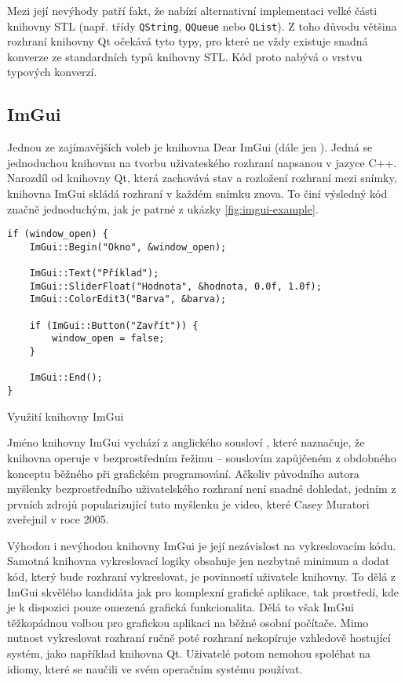 
Mezi její nevýhody patří fakt, že nabízí alternativní implementaci velké části knihovny STL (např. třídy \texttt{QString}, \texttt{QQueue} nebo \texttt{QList}). Z toho důvodu většina rozhraní knihovny Qt očekává tyto typy, pro které ne vždy existuje snadná konverze ze standardních typů knihovny STL. Kód proto nabývá o vrstvu typových konverzí.

\subsection{ImGui}

Jednou ze zajímavějších voleb je knihovna Dear ImGui\cite{github-imgui} (dále jen ). Jedná se jednoduchou knihovnu na tvorbu uživateského rozhraní napsanou v jazyce C++. Narozdíl od knihovny Qt, která zachovává stav a rozložení rozhraní mezi snímky, knihovna ImGui skládá rozhraní v každém snímku znova. To činí výsledný kód značně jednoduchým, jak je patrné z ukázky \ref{fig:imgui-example}.

\begin{listing}
\begin{verbatim}
if (window_open) {
    ImGui::Begin("Okno", &window_open);

    ImGui::Text("Příklad");
    ImGui::SliderFloat("Hodnota", &hodnota, 0.0f, 1.0f);
    ImGui::ColorEdit3("Barva", &barva);
    
    if (ImGui::Button("Zavřít")) {
        window_open = false;
    }

    ImGui::End();
}
\end{verbatim}
\caption{Využití knihovny ImGui}
\label{fig:imgui-example}
\end{listing}

Jméno knihovny ImGui vychází z anglického sousloví , které naznačuje, že knihovna operuje v bezprostředním řežimu -- souslovím zapůjčeném z obdobného konceptu běžného při grafickém programování. Ačkoliv původního autora myšlenky bezprostředního uživatelského rozhraní není snadné dohledat, jedním z prvních zdrojů popularizující tuto myšlenku je video, které Casey Muratori zveřejnil v roce 2005\cite{casey-imgui}.


Výhodou i nevýhodou knihovny ImGui je její nezávislost na vykreslovacím kódu. Samotná knihovna vykreslovací logiky obsahuje jen nezbytné minimum a dodat kód, který bude rozhraní vykreslovat, je povinností uživatele knihovny. To dělá z ImGui skvělého kandidáta jak pro komplexní grafické aplikace, tak prostředí, kde je k dispozici pouze omezená grafická funkcionalita. Dělá to však ImGui těžkopádnou volbou pro grafickou aplikaci na běžné osobní počítače. Mimo nutnost vykreslovat rozhraní ručně poté rozhraní nekopíruje vzhledově hostující systém, jako například knihovna Qt. Uživatelé potom nemohou spoléhat na idiomy, které se naučili ve svém operačním systému používat.

